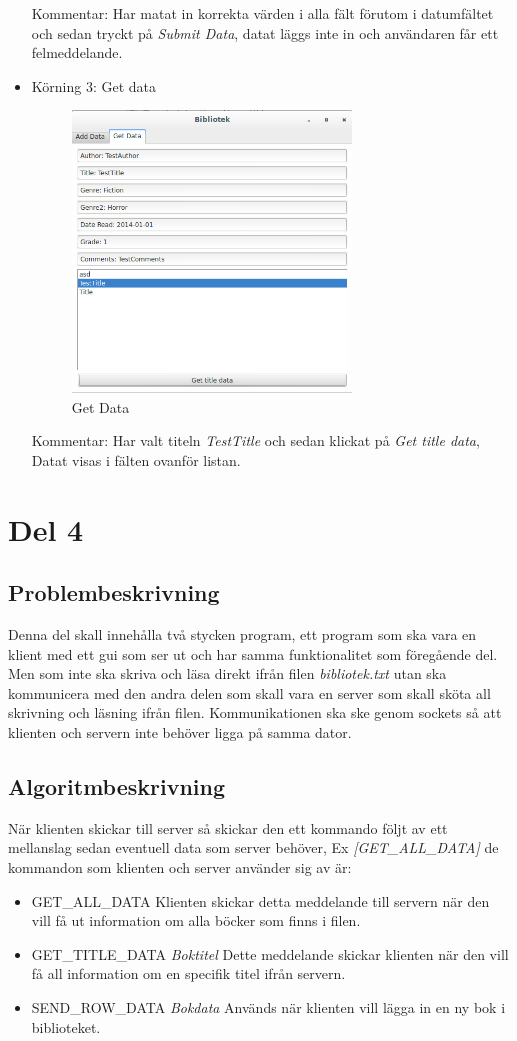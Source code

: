 \documentclass[11pt, titlepage, oneside, a4paper]{article}
\newcommand{\Section}[1]{\section{#1}\vspace{-8pt}}
\newcommand{\Subsection}[1]{\vspace{-4pt}\subsection{#1}\vspace{-8pt}}
\begin{document}
\begin{itemize}
Kommentar: Har matat in korrekta värden i alla fält förutom i datumfältet och sedan tryckt på \emph{Submit Data}, datat läggs inte in och användaren 
får ett felmeddelande.

  \newpage
 
    \item Körning 3: Get data
    \subitem \begin{figure}[h]
    \centering
    \includegraphics[width=0.7\textwidth]{getSuccess.png}
    \caption{Get Data}
    \label{fig:getData}
\end{figure}

Kommentar: Har valt titeln \emph{TestTitle} och sedan klickat på \emph{Get title data}, Datat visas i fälten ovanför listan.
		\end{itemize}

	\Section{Del 4}	
		\Subsection{Problembeskrivning}
		Denna del skall innehålla två stycken program, ett program som ska vara en klient med ett gui som ser ut och har samma funktionalitet som föregående del. 
		Men som inte ska skriva och läsa direkt ifrån filen \emph{bibliotek.txt} utan ska kommunicera med den andra delen som skall vara en server som skall sköta all skrivning
		och läsning ifrån filen.
		Kommunikationen ska ske genom sockets så att klienten och servern inte behöver ligga på samma dator.
		\Subsection{Algoritmbeskrivning}
		När klienten skickar till server så skickar den ett kommando följt av ett mellanslag sedan eventuell data som server behöver, Ex \emph{[GET\_ALL\_DATA]} 
		de kommandon som klienten och server använder sig av är:
		
		\newpage
		\begin{itemize}
		 \item GET\_ALL\_DATA
		 \subitem Klienten skickar detta meddelande till servern när den vill få ut information om alla böcker som finns i filen.
		 \item GET\_TITLE\_DATA \emph{Boktitel}
		 \subitem Dette meddelande skickar klienten när den vill få all information om en specifik titel ifrån servern.
		 \item SEND\_ROW\_DATA \emph{Bokdata}
		 \subitem Används när klienten vill lägga in en ny bok i biblioteket.
		\end{itemize}
\end{document}
